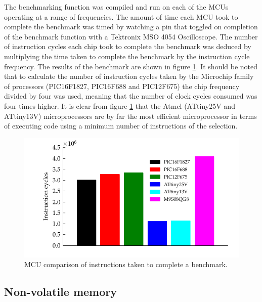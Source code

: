 The benchmarking function was compiled and run on each of the MCUs
operating at a range of frequencies. The amount of time each MCU took
to complete the benchmark was timed by watching a pin that toggled
on completion of the benchmark function with a Tektronix MSO 4054
Oscilloscope. The number of instruction cycles each chip took to complete
the benchmark was deduced by multiplying the time taken to complete
the benchmark by the instruction cycle frequency. The results of the
benchmark are shown in figure \ref{fig:GraphBar_All_Benchmark}. It
should be noted that to calculate the number of instruction cycles
taken by the Microchip family of processors (PIC16F1827, PIC16F688
and PIC12F675) the chip frequency divided by four was used, meaning
that the number of clock cycles consumed was four times higher. It
is clear from figure \ref{fig:GraphBar_All_Benchmark} that the Atmel
(ATtiny25V and ATtiny13V) microprocessors are by far the most efficient
microprocessor in terms of executing code using a minimum number of
instructions of the selection.

\begin{figure}
    \begin{centering}
        \includegraphics{content/pt1/02-Microcontrollers/graphics/Graph_All_Clock_Benchmark}
    \end{centering}
    \protect\caption{\label{fig:GraphBar_All_Benchmark}MCU comparison of instructions
    taken to complete a benchmark.}
\end{figure}



\subsection{Non-volatile memory}

